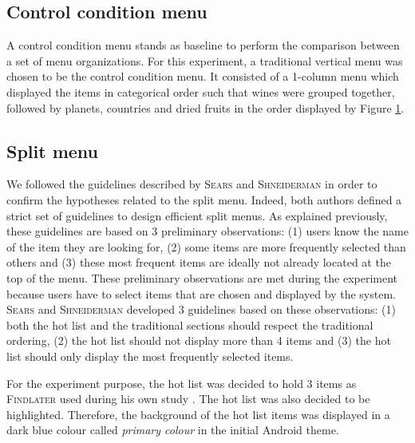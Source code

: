 \begin{figure}[!ht]
    
    \label{fig:items}
\end{figure}

\subsection{Control condition menu}
A control condition menu stands as baseline to perform the comparison between a 
set of menu organizations. For this experiment, a traditional vertical menu 
was chosen to be the control condition menu. It consisted of a 1-column menu 
which displayed the items in categorical order such that wines were grouped 
together, followed by planets, countries and dried fruits in the order 
displayed 
by Figure \ref{fig:items}.

%     

\subsection{Split menu}
We followed the guidelines described by \textsc{Sears} and \textsc{Shneiderman} 
in order to 
confirm the hypotheses related to the split menu. Indeed, both authors defined 
a 
strict set of guidelines to design efficient split menus. As explained 
previously, these guidelines are based on 3 preliminary observations: (1) 
users know the name of the item they are looking for, (2) some items are 
more frequently selected than others and (3) these most frequent items are 
ideally not already located at the top of the menu. These preliminary 
observations are met during the experiment because users have to select items 
that are chosen and displayed by the system. \textsc{Sears} and 
\textsc{Shneiderman} developed 3 
guidelines based on these observations: (1) both the hot list and the 
traditional sections should respect the traditional ordering, (2) the hot list 
should not display more than 4 items and (3) the hot list should only display 
the most frequently selected items.\newline

For the experiment purpose, the hot list was decided to hold 3 items as 
\textsc{Findlater} used during his own study \cite{findlater}. The hot list was 
also 
decided to be highlighted. Therefore, the background of the hot list items was 
displayed in a dark blue colour called \textit{primary colour} in the initial 
Android theme.

